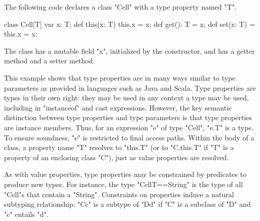 The following code declares a class \xcd"Cell" with a type
property named \xcd"T".
\begin{xten}
class Cell[T] {
    var x: T;
    def this(x: T) { this.x = x; }
    def get(): T = x;
    def set(x: T) = { this.x = x: }
}
\end{xten}
The class has a mutable field \xcd"x", initialized by the
constructor, and has a getter method and a setter method.

This example shows that type properties are in many ways similar to
type parameters as provided in languages such as Java and Scala.
Type properties are types in their own right:
they may be used in any context a type may be used,
including in \xcd"instanceof" and cast expressions.
However, the key semantic distinction between type properties
and type parameters is that type properties are instance
members.
Thus, for an expression \xcd"e" of type \xcd"Cell", \xcd"e.T" is a type. 
To ensure
soundness, \xcd"e" is restricted to final access paths.
Within the body of a class, a property name \xcd"T" resolves
to \xcd"this.T" (or to \xcd"C.this.T" if \xcd"T" is a property of
an enclosing class \xcd"C"), just as value properties are
resolved.

As with value properties, type properties may be constrained
by predicates to produce new types.
For instance, the type \xcd"Cell{T==String}" is the type of
all \xcd"Cell"s that contain a \xcd"String".
Constraints on properties induce a natural subtyping relationship:
\xcd"C{c}" is a subtype of
\xcd"D{d}" if \xcd"C" is a subclass of \xcd"D" and
\xcd"c" entails \xcd"d".

